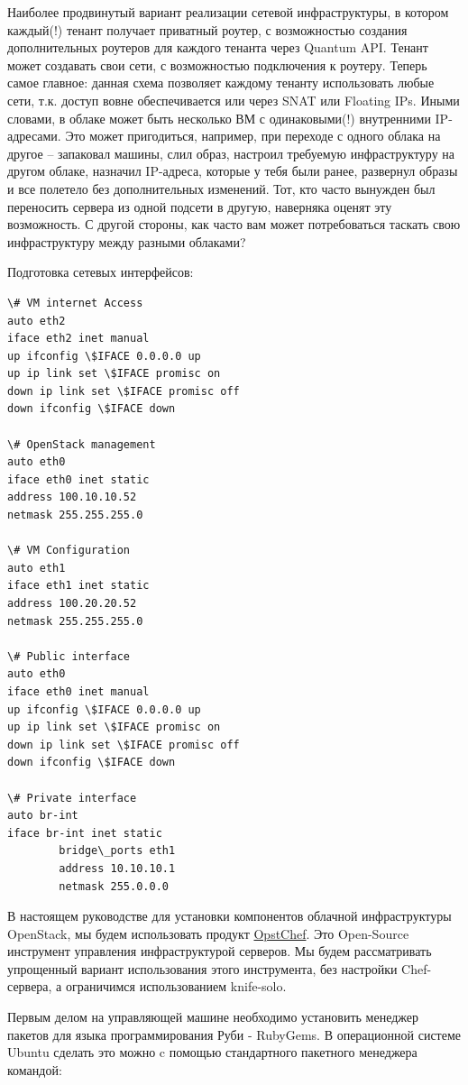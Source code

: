 \documentclass[letterpaper,10pt,russian]{sphinxmanual}
\begin{document}
Наиболее продвинутый вариант реализации сетевой инфраструктуры, в котором каждый(!) тенант получает приватный роутер, с возможностью создания дополнительных роутеров для каждого тенанта через Quantum API. Тенант может создавать свои сети, с возможностью подключения к роутеру. Теперь самое главное: данная схема позволяет каждому тенанту использовать любые сети, т.к. доступ вовне обеспечивается или через SNAT или Floating IPs. Иными словами, в облаке может быть несколько ВМ с одинаковыми(!) внутренними IP-адресами. Это может пригодиться, например, при переходе с одного облака на другое – запаковал машины, слил образ, настроил требуемую инфраструктуру на другом облаке, назначил IP-адреса, которые у тебя были ранее, развернул образы и все полетело без дополнительных изменений. Тот, кто часто вынужден был переносить сервера из одной подсети в другую, наверняка оценят эту возможность. С другой стороны, как часто вам может потребоваться таскать свою инфраструктуру между разными облаками?

Подготовка сетевых интерфейсов:

\begin{Verbatim}[commandchars=\\\{\}]
\# VM internet Access
auto eth2
iface eth2 inet manual
up ifconfig \$IFACE 0.0.0.0 up
up ip link set \$IFACE promisc on
down ip link set \$IFACE promisc off
down ifconfig \$IFACE down

\# OpenStack management
auto eth0
iface eth0 inet static
address 100.10.10.52
netmask 255.255.255.0

\# VM Configuration
auto eth1
iface eth1 inet static
address 100.20.20.52
netmask 255.255.255.0

\# Public interface
auto eth0
iface eth0 inet manual
up ifconfig \$IFACE 0.0.0.0 up
up ip link set \$IFACE promisc on
down ip link set \$IFACE promisc off
down ifconfig \$IFACE down

\# Private interface
auto br-int
iface br-int inet static
        bridge\_ports eth1
        address 10.10.10.1
        netmask 255.0.0.0
\end{Verbatim}

В настоящем руководстве для установки компонентов облачной инфраструктуры OpenStack, мы будем использовать продукт \href{http://www.opst.com/chef}{OpstChef}. Это Open-Source инструмент управления инфраструктурой серверов. Мы будем рассматривать упрощенный вариант использования этого инструмента, без настройки Chef-сервера, а ограничимся использованием knife-solo.

Первым делом на управляющей машине необходимо установить менеджер пакетов для языка программирования Руби - RubyGems. В операционной системе Ubuntu сделать это можно c помощью стандартного пакетного менеджера командой:
\end{document}
